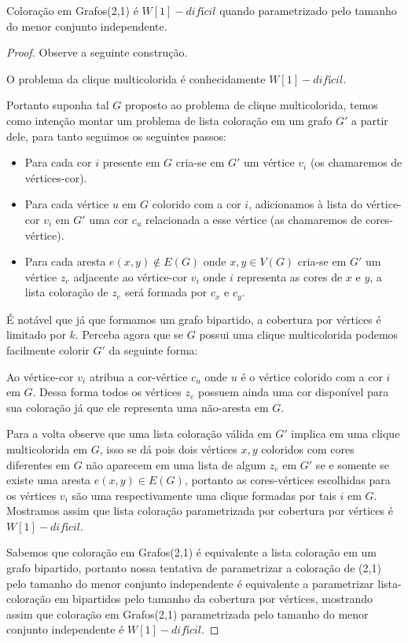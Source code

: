 \begin{teorema}
	Coloração em Grafos(2,1) é $W[1]-difícil$ quando parametrizado pelo tamanho do menor conjunto independente.
\end{teorema}
\begin{proof}
	Observe a seguinte construção.
	
	O problema da clique multicolorida é conhecidamente $W[1]-difícil$\cite{fellows07}.
	
	Portanto suponha tal $G$ proposto ao problema de clique multicolorida, temos como intenção montar um problema de lista coloração em um grafo $G'$ a partir dele, para tanto seguimos os seguintes passos:
	\begin{itemize}
		\item Para cada cor $i$ presente em $G$ cria-se em $G'$ um vértice $v_i$ (os chamaremos de vértices-cor).
		\item Para cada vértice $u$ em $G$ colorido com a cor $i$, adicionamos à lista do vértice-cor $v_i$ em $G'$ uma cor $c_u$ relacionada a esse vértice (as chamaremos de cores-vértice).
		\item Para cada aresta $e(x,y) \notin E(G)$ onde $x,y \in V(G)$ cria-se em $G'$ um vértice $z_e$ adjacente ao vértice-cor $v_i$ onde $i$ representa as cores de $x$ e $y$, a lista coloração de $z_e$ será formada por $c_x$ e $c_y$.
	\end{itemize}
	É notável que já que formamos um grafo bipartido, a cobertura por vértices é limitado por $k$. Perceba agora que se $G$ possui uma clique multicolorida podemos facilmente colorir $G'$ da seguinte forma:
	
	Ao vértice-cor $v_i$ atribua a cor-vértice $c_u$ onde $u$ é o vértice colorido com a cor $i$ em $G$. Dessa forma todos os vértices $z_e$ possuem ainda uma cor disponível para sua coloração já que ele representa uma não-aresta em $G$. 
	
	Para a volta observe que uma lista coloração válida em $G'$ implica em uma clique multicolorida em $G$, isso se dá pois dois vértices $x,y$ coloridos com cores diferentes em $G$ não aparecem em uma lista de algum $z_e$ em $G'$ se e somente se existe uma aresta $e(x,y) \in E(G)$, portanto as cores-vértices escolhidas para os vértices $v_i$ são uma respectivamente uma clique formadas por tais $i$ em $G$. Mostramos assim que lista coloração parametrizada por cobertura por vértices é $W[1]-difícil$.
	
	Sabemos que coloração em Grafos(2,1) é equivalente a lista coloração em um grafo bipartido, portanto nossa tentativa de parametrizar a coloração de (2,1) pelo tamanho do menor conjunto independente é equivalente a parametrizar lista-coloração em bipartidos pelo tamanho da cobertura por vértices, mostrando assim que coloração em Grafos(2,1) parametrizada pelo tamanho do menor conjunto independente é $W[1]-difícil$. 
	
\end{proof}

